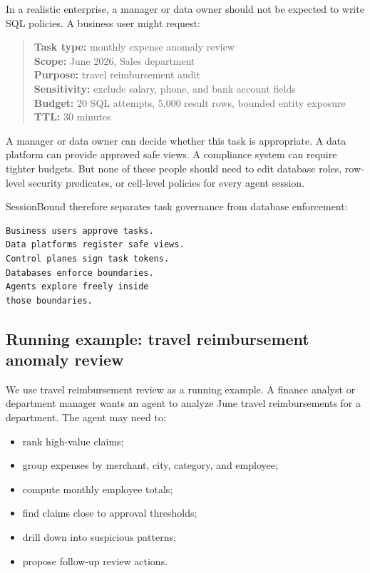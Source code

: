 \documentclass[journal]{IEEEtran}
\providecommand{\tightlist}{%
  \setlength{\itemsep}{0pt}\setlength{\parskip}{0pt}}
\begin{document}
In a realistic enterprise, a manager or data owner should not be
expected to write SQL policies. A business user might request:

\begin{samepage}
\begin{quote}
\footnotesize
\textbf{Task type:} monthly expense anomaly review\\
\textbf{Scope:} June 2026, Sales department\\
\textbf{Purpose:} travel reimbursement audit\\
\textbf{Sensitivity:} exclude salary, phone, and bank account fields\\
\textbf{Budget:} 20 SQL attempts, 5,000 result rows, bounded entity exposure\\
\textbf{TTL:} 30 minutes
\end{quote}
\end{samepage}

A manager or data owner can decide whether this task is appropriate. A
data platform can provide approved safe views. A compliance system can
require tighter budgets. But none of these people should need to edit
database roles, row-level security predicates, or cell-level policies
for every agent session.

SessionBound therefore separates task governance from database
enforcement:

\begin{verbatim}
Business users approve tasks.
Data platforms register safe views.
Control planes sign task tokens.
Databases enforce boundaries.
Agents explore freely inside
those boundaries.
\end{verbatim}

\hypertarget{running-example-travel-reimbursement-anomaly-review}{%
\subsection{Running example: travel reimbursement anomaly
review}\label{running-example-travel-reimbursement-anomaly-review}}

We use travel reimbursement review as a running example. A finance
analyst or department manager wants an agent to analyze June travel
reimbursements for a department. The agent may need to:

\begin{itemize}
\tightlist
\item
  rank high-value claims;
\item
  group expenses by merchant, city, category, and employee;
\item
  compute monthly employee totals;
\item
  find claims close to approval thresholds;
\item
  drill down into suspicious patterns;
\item
  propose follow-up review actions.
\end{itemize}
\end{document}
